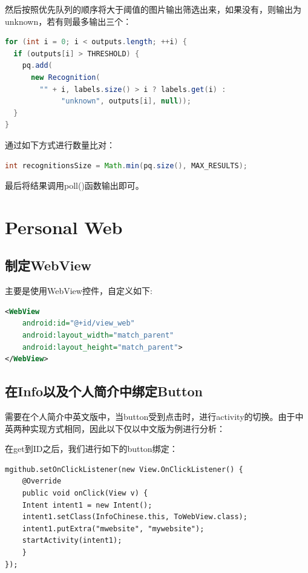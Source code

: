 \documentclass[UTF8, Microsoft YaHei]{book}
\begin{document}
然后按照优先队列的顺序将大于阈值的图片输出筛选出来，如果没有，则输出为unknown，若有则最多输出三个：

\begin{small}
\begin{lstlisting}[language=java]
for (int i = 0; i < outputs.length; ++i) {
  if (outputs[i] > THRESHOLD) {
    pq.add(
      new Recognition(
        "" + i, labels.size() > i ? labels.get(i) :
        	 "unknown", outputs[i], null));
  }
}
\end{lstlisting}
\end{small}

通过如下方式进行数量比对：
\begin{small}
\begin{lstlisting}[language=java]
int recognitionsSize = Math.min(pq.size(), MAX_RESULTS);
\end{lstlisting}
\end{small}

	最后将结果调用poll()函数输出即可。

    \section{Personal Web}
    \subsection{制定WebView}
    主要是使用WebView控件，自定义如下:

\begin{small}
\begin{lstlisting}[language=xml]
<WebView
    android:id="@+id/view_web"
    android:layout_width="match_parent"
    android:layout_height="match_parent">
</WebView>
\end{lstlisting}
\end{small}

	\subsection{在Info以及个人简介中绑定Button}
	需要在个人简介中英文版中，当button受到点击时，进行activity的切换。由于中英两种实现方式相同，因此以下仅以中文版为例进行分析：

	在get到ID之后，我们进行如下的button绑定：

\begin{small}
\begin{lstlisting}[language=xml]
mgithub.setOnClickListener(new View.OnClickListener() {
    @Override
    public void onClick(View v) {
    Intent intent1 = new Intent();
    intent1.setClass(InfoChinese.this, ToWebView.class);
    intent1.putExtra("mwebsite", "mywebsite");
    startActivity(intent1);
    }
});
\end{lstlisting}
\end{small}
\end{document}
